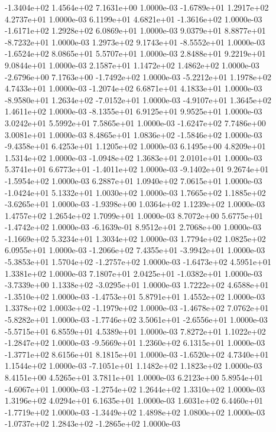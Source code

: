 -1.3404e+02  1.4564e+02  7.1631e+00  1.0000e-03
-1.6789e+01  1.2917e+02  4.2737e+01  1.0000e-03
 6.1199e+01  4.6821e+01 -1.3616e+02  1.0000e-03
-1.6171e+02  1.2928e+02  6.0869e+01  1.0000e-03
 9.0379e+01  8.8877e+01 -8.7232e+01  1.0000e-03
 1.2973e+02  9.1743e+01 -8.5552e+01  1.0000e-03
-1.6524e+02  8.0865e+01  5.5707e+01  1.0000e-03
2.8488e+01 9.2219e+01 9.0844e+01  1.0000e-03
2.1587e+01 1.1472e+02 1.4862e+02  1.0000e-03
-2.6796e+00  7.1763e+00 -1.7492e+02  1.0000e-03
-5.2212e+01  1.1978e+02  4.7433e+01  1.0000e-03
-1.2074e+02  6.6871e+01  4.1833e+01  1.0000e-03
-8.9580e+01  1.2634e+02 -7.0152e+01  1.0000e-03
-4.9107e+01  1.3645e+02  1.4611e+02  1.0000e-03
-8.1355e+01  6.9125e+01  9.9525e+01  1.0000e-03
3.0242e+01 5.5992e+01 7.5865e+01  1.0000e-03
-1.6247e+02  7.7486e+00  3.0081e+01  1.0000e-03
 8.4865e+01  1.0836e+02 -1.5846e+02  1.0000e-03
-9.4358e+01  6.4253e+01  1.1205e+02  1.0000e-03
6.1495e+00 4.8209e+01 1.5314e+02  1.0000e-03
-1.0948e+02  1.3683e+01  2.0101e+01  1.0000e-03
 5.3741e+01  6.6773e+01 -1.4011e+02  1.0000e-03
-9.1402e+01  9.2674e+01 -1.5954e+02  1.0000e-03
6.2887e+01 1.0940e+02 7.0615e+01  1.0000e-03
-1.0424e+01  5.1332e+01  1.0030e+02  1.0000e-03
 1.7665e+02  1.1885e+02 -3.6265e+01  1.0000e-03
-1.9398e+00  1.0364e+02  1.1239e+02  1.0000e-03
1.4757e+02 1.2654e+02 1.7099e+01  1.0000e-03
 8.7072e+00  5.6775e+01 -1.4742e+02  1.0000e-03
-6.1639e-01  8.9512e+01  2.7068e+00  1.0000e-03
-1.1669e+02  5.3234e+01  1.3034e+02  1.0000e-03
1.7794e+02 1.0825e+02 6.0955e+01  1.0000e-03
-1.2066e+02  7.4355e+01 -3.9942e+01  1.0000e-03
-5.3853e+01  1.5704e+02 -1.2757e+02  1.0000e-03
-1.6473e+02  4.5951e+01  1.3381e+02  1.0000e-03
 7.1807e+01  2.0425e+01 -1.0382e+01  1.0000e-03
-3.7339e+00  1.1338e+02 -3.0295e+01  1.0000e-03
 1.7222e+02  4.6588e+01 -1.3510e+02  1.0000e-03
-1.4753e+01  5.8791e+01  1.4552e+02  1.0000e-03
 1.3378e+02  1.0003e+02 -1.1979e+02  1.0000e-03
-1.4678e+02  7.0762e+01 -5.8282e+01  1.0000e-03
-1.7746e+02  3.5061e+01 -2.6556e+01  1.0000e-03
-5.5715e+01  6.8559e+01  4.5389e+01  1.0000e-03
 7.8272e+01  1.1022e+02 -1.2847e+02  1.0000e-03
-9.5669e+01  1.2360e+02  6.1315e+01  1.0000e-03
-1.3771e+02  8.6156e+01  8.1815e+01  1.0000e-03
-1.6520e+02  4.7340e+01  1.1544e+02  1.0000e-03
-7.1051e+01  1.1482e+02  1.1823e+02  1.0000e-03
8.4151e+00 4.5265e+01 3.7811e+01  1.0000e-03
 6.2123e+00  5.8954e+01 -4.6067e+01  1.0000e-03
-1.2754e+02  1.2644e+02  1.3310e+02  1.0000e-03
1.3196e+02 4.0294e+01 6.1635e+01  1.0000e-03
 1.6031e+02  6.4460e+01 -1.7719e+02  1.0000e-03
-1.3449e+02  1.4898e+02  1.0800e+02  1.0000e-03
-1.0737e+02  1.2843e+02 -1.2865e+02  1.0000e-03
